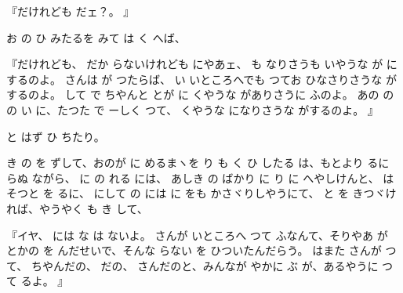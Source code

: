
『だけれども
だェ？。
』

お
の
ひ
みたるを
みて
は
く
へば、

『だけれども、
だか
らないけれども
にやあェ、
も
なりさうも
いやうな
が
にするのよ。
さんは
が
つたらば、
い
いところへでも
つてお
ひなさりさうな
がするのよ。
して
で
ちやんと
とが
に
くやうな
がありさうに
ふのよ。
あの
の
の
い
に、たつた
で
ーしく
つて、
くやうな
になりさうな
がするのよ。
』

と
はず
ひ
ちたり。

き
の
を
ずして、おのが
に
めるまヽを
り
も
く
ひ
したる
は、もとより
るに
らぬ
ながら、
に
の
れる
には、
あしき
の
ばかり
に
り
に
へやしけんと、
はそつと
を
るに、
にして
の
には
に
をも
かさヾりしやうにて、
と
を
きつヾけ
れば、やうやく
も
き
して、

『イヤ、
には
な
は
ないよ。
さんが
いところへ
つて
ふなんて、そりやあ
が
とかの
を
んだせいで、そんな
らない
を
ひついたんだらう。
はまた
さんが
つて、
ちやんだの、
だの、
さんだのと、みんなが
やかに
ぶ
が、あるやうに
つて
るよ。
』

